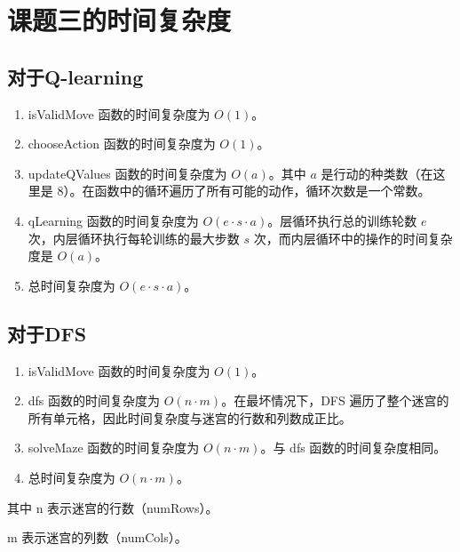 \documentclass[UTF8,titlepage]{ctexart}
\numberwithin{figure}{section}
\begin{document}
\section{课题三的时间复杂度}
\subsection{对于Q-learning}

\begin{enumerate}
\item isValidMove 函数的时间复杂度为 $O(1)$。
\item chooseAction 函数的时间复杂度为 $O(1)$。
\item updateQValues 函数的时间复杂度为 $O(a)$。其中 $a$ 是行动的种类数（在这里是 8）。在函数中的循环遍历了所有可能的动作，循环次数是一个常数。
\item qLearning 函数的时间复杂度为 $O(e \cdot s \cdot a)$。层循环执行总的训练轮数 $e$ 次，内层循环执行每轮训练的最大步数 $s$ 次，而内层循环中的操作的时间复杂度是 $O(a)$。
\item 总时间复杂度为 $O(e \cdot s \cdot a)$。
\end{enumerate}

\subsection{对于DFS}

\begin{enumerate}
\item isValidMove 函数的时间复杂度为 $O(1)$。
\item dfs 函数的时间复杂度为 $O(n \cdot m)$。在最坏情况下，DFS 遍历了整个迷宫的所有单元格，因此时间复杂度与迷宫的行数和列数成正比。
\item solveMaze 函数的时间复杂度为 $O(n \cdot m)$。与 dfs 函数的时间复杂度相同。
\item 总时间复杂度为 $O(n \cdot m)$。
\end{enumerate}
其中
n 表示迷宫的行数（numRows）。

m 表示迷宫的列数（numCols）。
\end{document}
